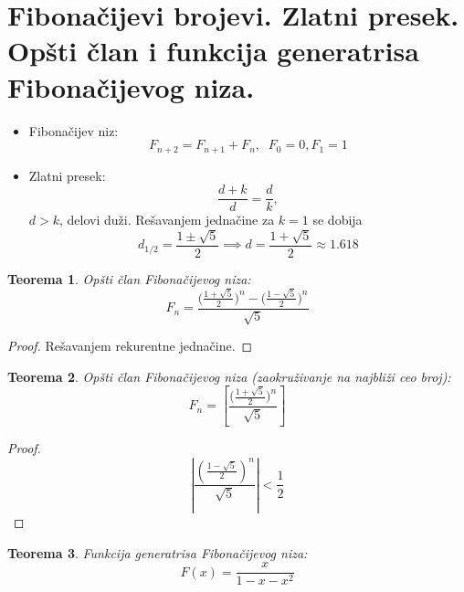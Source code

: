 \documentclass[a4paper,12pt]{article}
\numberwithin{algorithm}{section}
\theoremstyle{plain}
\newtheorem{theorem}{Teorema}[section]
\theoremstyle{definition}
\theoremstyle{remark}
\begin{document}
\section{Fibonačijevi brojevi. Zlatni presek. Opšti član i funkcija generatrisa
Fibonačijevog niza. }

\begin{itemize}
    \item Fibonačijev niz: \[ F_{n+2} = F_{n+1} + F_n, \;\; F_0 = 0, F_1 = 1 \]
    \item Zlatni presek:
    \[ \frac{d + k}{d} = \frac{d}{k}, \]
    $d > k$, delovi duži. Rešavanjem jednačine za $k = 1$ se dobija
    \[ d_{1/2} = \frac{1 \pm \sqrt{5}}{2} \implies d =  \frac{1 + \sqrt{5}}{2} \approx 1.618\]
\end{itemize}
\begin{theorem}
    Opšti član Fibonačijevog niza:
    \[ F_n = \frac{\bigg(\frac{1 + \sqrt{5}}{2}\bigg)^n - \bigg(\frac{1 - \sqrt{5}}{2}\bigg)^n}{\sqrt{5}} \]
\end{theorem}
\begin{proof}
    Rešavanjem rekurentne jednačine.
\end{proof}

\begin{theorem}
    Opšti član Fibonačijevog niza (zaokruživanje na najbliži ceo broj):
    $$ F_n = \left[ \frac{\bigg(\frac{1+\sqrt{5}}{2}\bigg)^n}{\sqrt{5}} \right] $$
\end{theorem}
\begin{proof}
    \[\left| \frac{\left(\frac{1-\sqrt{5}}{2}\right)^n}{\sqrt{5}} \right| < \frac{1}{2}\]
\end{proof}

\begin{theorem}
    Funkcija generatrisa Fibonačijevog niza:
    \[ F(x) = \frac{x}{1-x-x^2} \]
\end{theorem}
\end{document}
